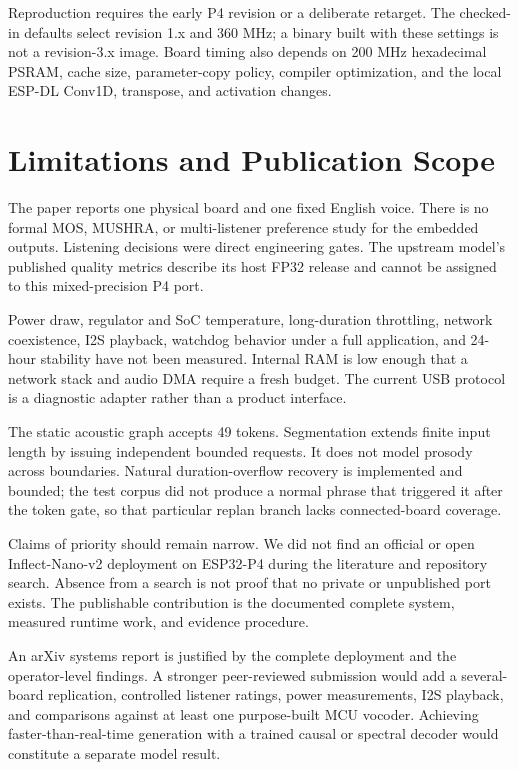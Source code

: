\documentclass[10pt]{article}
\begin{document}
Reproduction requires the early P4 revision or a deliberate retarget. The
checked-in defaults select revision 1.x and 360 MHz; a binary built with these
settings is not a revision-3.x image. Board timing also depends on 200 MHz
hexadecimal PSRAM, cache size, parameter-copy policy, compiler optimization,
and the local ESP-DL Conv1D, transpose, and activation changes.

\section{Limitations and Publication Scope}

The paper reports one physical board and one fixed English voice. There is no
formal MOS, MUSHRA, or multi-listener preference study for the embedded
outputs. Listening decisions were direct engineering gates. The upstream
model's published quality metrics describe its host FP32 release and cannot be
assigned to this mixed-precision P4 port.

Power draw, regulator and SoC temperature, long-duration throttling, network
coexistence, I2S playback, watchdog behavior under a full application, and
24-hour stability have not been measured. Internal RAM is low enough that a
network stack and audio DMA require a fresh budget. The current USB protocol
is a diagnostic adapter rather than a product interface.

The static acoustic graph accepts 49 tokens. Segmentation extends finite input
length by issuing independent bounded requests. It does not model prosody
across boundaries. Natural duration-overflow recovery is implemented and
bounded; the test corpus did not produce a normal phrase that triggered it
after the token gate, so that particular replan branch lacks connected-board
coverage.

Claims of priority should remain narrow. We did not find an official or open
Inflect-Nano-v2 deployment on ESP32-P4 during the literature and repository
search. Absence from a search is not proof that no private or unpublished port
exists. The publishable contribution is the documented complete system,
measured runtime work, and evidence procedure.

An arXiv systems report is justified by the complete deployment and the
operator-level findings. A stronger peer-reviewed submission would add a
several-board replication, controlled listener ratings, power measurements,
I2S playback, and comparisons against at least one purpose-built MCU vocoder.
Achieving faster-than-real-time generation with a trained causal or spectral
decoder would constitute a separate model result.
\end{document}
